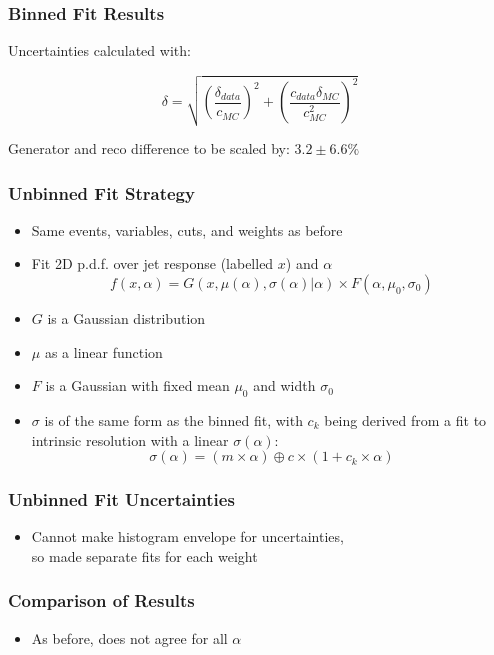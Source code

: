 \documentclass{beamer}
\newcommand{\beginbackup}{
  \newcounter{framenumbervorappendix}
  \setcounter{framenumbervorappendix}{\value{framenumber}}
}
\newcommand{\backupend}{
  \addtocounter{framenumbervorappendix}{-\value{framenumber}}
  \addtocounter{framenumber}{\value{framenumbervorappendix}}
}
\begin{document}
\begin{frame}
  \frametitle{Binned Fit Results}

  Uncertainties calculated with:

  \[
  \delta = \sqrt{\left(\frac{\delta_{data}}{c_{MC}}\right)^2 +
    \left(\frac{c_{data}\delta_{MC}}{c_{MC}^2}\right)^2}
  \]

  \vfill

  Generator and reco difference to be scaled by: $3.2 \pm 6.6 \%$

\end{frame}


\begin{frame}
  \frametitle{Unbinned Fit Strategy}

  \begin{itemize}
  \item Same events, variables, cuts, and weights as before
  \item Fit 2D p.d.f. over jet response (labelled $x$) and $\alpha$
  \[
  f(x, \alpha) =
  G(x, \mu(\alpha), \sigma(\alpha)|\alpha)
  \times
  F(\alpha, \mu_0, \sigma_0)
  \]
  \item $G$ is a Gaussian distribution
  \item $\mu$ as a linear function
  \item $F$ is a Gaussian with fixed mean $\mu_0$ and width $\sigma_0$
  \item $\sigma$ is of the same form as the binned fit,
    with $c_k$ being derived from a fit to
    intrinsic resolution with a linear $\sigma(\alpha)$:
  \[
  \sigma(\alpha) = (m \times \alpha) \oplus c \times (1 + c_k \times \alpha)
  \]
  \end{itemize}

\end{frame}


\begin{frame}
  \frametitle{Unbinned Fit Uncertainties}

  \begin{itemize}
  \item Cannot make histogram envelope for uncertainties, \\
    so made separate fits for each weight
  \end{itemize}

\end{frame}


\begin{frame}
  \frametitle{Comparison of Results}

  \begin{itemize}
  \item As before, does not agree for all $\alpha$
  \end{itemize}

\end{frame}



\begin{comment}
\beginbackup

\begin{frame}
  \centering
    {\Huge \bf\sffamily Backup Slides}
\end{frame}



\backupend
\end{comment}
\end{document}
